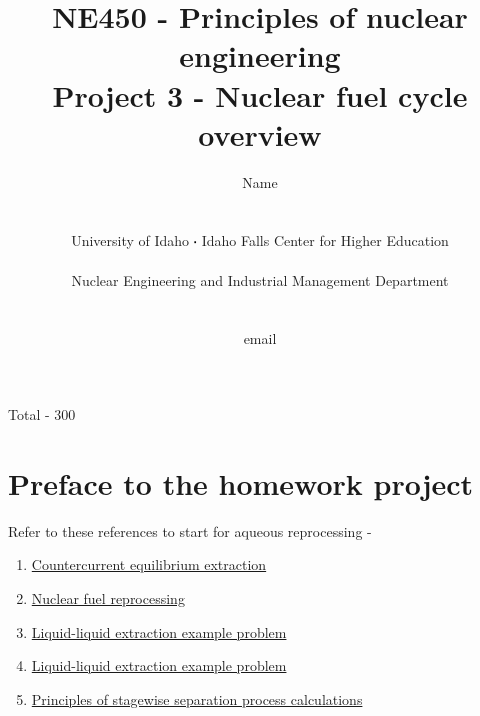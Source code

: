 \documentclass[11pt,a4paper]{article}
\newcommand*\sq{\mathbin{\vcenter{\hbox{\rule{.3ex}{.3ex}}}}} %
\begin{document}
\begin{titlepage}
    \title{
        NE450 - Principles of nuclear engineering\\
        Project 3 - Nuclear fuel cycle overview\\
    }
    \author{
        Name
        \\ \\ \\
        University of Idaho $\sq$ Idaho Falls Center for Higher Education
        \\ \\
        Nuclear Engineering and Industrial Management Department
        \\ \\ \\
        email 
    }
\clearpage %
\maketitle
\vspace*{\fill}
\begin{flushright}{
        Total - 300 
}
\end{flushright}
\thispagestyle{empty} %
\end{titlepage}

\section{Preface to the homework project}

\noindent Refer to these references to start for aqueous reprocessing -
\begin{enumerate}[leftmargin=*,topsep=0pt,font=\bfseries]
    \item\href{../homework-resources/countercurrent-equilibrium-extraction.pdf}{Countercurrent equilibrium extraction}
    \item\href{../homework-resources/nuclear-fuel-reprocessing.pdf}{Nuclear fuel reprocessing}
    \item\href{https://youtu.be/HGwHLaPhw30}{Liquid-liquid extraction example problem}
    \item\href{https://youtu.be/vK8XGYwnZv4}{Liquid-liquid extraction example problem}
    \item\href{../homework-resources/principles-stagewise-separation-process-calculations.pdf}{Principles of stagewise separation process calculations}
\end{enumerate}
\vspace{\baselineskip}
\end{document}
